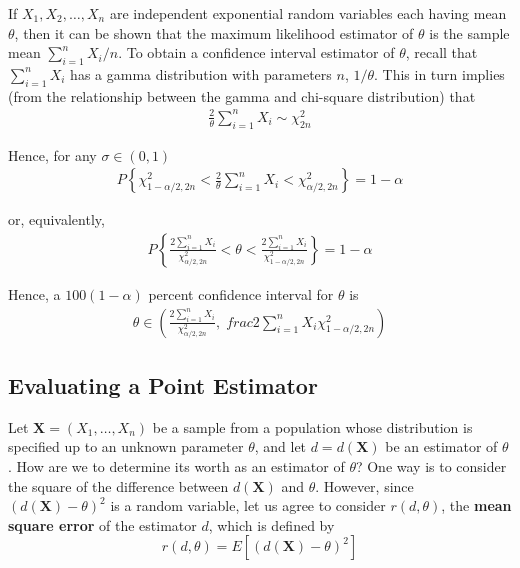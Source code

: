 \documentclass[12pt]{article}
\begin{document}
If $X_1, X_2, \dots, X_n$ are independent exponential random variables each having mean $\theta$, then it can be shown that the maximum likelihood estimator of $\theta$ is the sample mean $\sum_{i=1}^n X_i / n$. To obtain a confidence interval estimator of $\theta$, recall that $\sum_{i=1}^n X_i$ has a gamma distribution with parameters $n$, $1 / \theta$. This in turn implies (from the relationship between the gamma and chi-square distribution) that
\begin{eqnarray*}
  \frac {2}{\theta} \sum_{i=1}^n X_i \sim \chi_{2n}^2
\end{eqnarray*}

Hence, for any $\sigma \in (0,1)$
\begin{eqnarray*}
  P \left\{ \chi_{1-\alpha / 2, 2n}^2
    < \frac {2}{\theta} \sum_{i=1}^n X_i
    < \chi_{\alpha / 2, 2n}^2 \right\} = 1 - \alpha
\end{eqnarray*}

or, equivalently,
\begin{eqnarray*}
  P \left\{ \frac {2 \sum_{i=1}^n X_i}{\chi_{\alpha / 2, 2n}^2}
    < \theta <\frac {2 \sum_{i=1}^n X_i}{\chi_{1-\alpha / 2, 2n}^2}
  \right\} = 1 - \alpha
\end{eqnarray*}

Hence, a $100(1 - \alpha)$ percent confidence interval for $\theta$ is
\begin{eqnarray*}
  \theta \in \left(
    \frac {2 \sum_{i=1}^n X_i}{\chi_{\alpha / 2, 2n}^2}
    , \; frac{2 \sum_{i=1}^n X_i}{\chi_{1-\alpha / 2, 2n}^2} \right)
\end{eqnarray*}

\subsection{Evaluating a Point Estimator}

Let $\textbf{X} = (X_1, \dots, X_n)$ be a sample from a population whose distribution is specified up to an unknown parameter $\theta$, and let $d = d(\textbf{X})$ be an estimator of $\theta$. How are we to determine its worth as an estimator of $\theta$? One way is to consider the square of the difference between $d(\textbf{X})$ and $\theta$. However, since $(d(\textbf{X}) - \theta)^2$ is a random variable, let us agree to consider $r(d, \theta)$, the \textbf{mean square error} of the estimator $d$, which is defined by
\begin{equation*}
  r(d, \theta) = E[(d(\textbf{X}) - \theta)^2]
\end{equation*}
\end{document}
